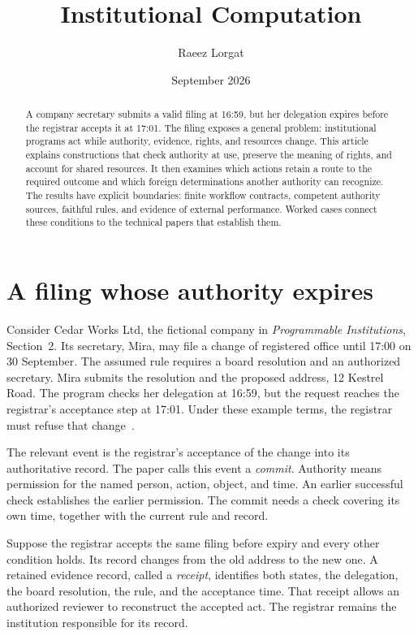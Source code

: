 \documentclass{momentum}
\title{Institutional Computation}
\author{Raeez Lorgat}
\date{September 2026}
\begin{document}
\maketitle

\begin{abstract}
A company secretary submits a valid filing at 16:59, but her delegation expires before the registrar accepts it at 17:01.
The filing exposes a general problem: institutional programs act while authority, evidence, rights, and resources change.
This article explains constructions that check authority at use, preserve the meaning of rights, and account for shared resources.
It then examines which actions retain a route to the required outcome and which foreign determinations another authority can recognize.
The results have explicit boundaries: finite workflow contracts, competent authority sources, faithful rules, and evidence of external performance.
Worked cases connect these conditions to the technical papers that establish them.
\end{abstract}

\section{A filing whose authority expires}
\label{sec:filing}

Consider Cedar Works Ltd, the fictional company in \emph{Programmable Institutions}, Section~2.
Its secretary, Mira, may file a change of registered office until 17:00 on 30 September.
The assumed rule requires a board resolution and an authorized secretary.
Mira submits the resolution and the proposed address, 12 Kestrel Road.
The program checks her delegation at 16:59, but the request reaches the registrar's acceptance step at 17:01.
Under these example terms, the registrar must refuse that change~\cite[Section~2]{institutions}.

The relevant event is the registrar's acceptance of the change into its authoritative record.
The paper calls this event a \emph{commit}.
Authority means permission for the named person, action, object, and time.
An earlier successful check establishes the earlier permission.
The commit needs a check covering its own time, together with the current rule and record.

Suppose the registrar accepts the same filing before expiry and every other condition holds.
Its record changes from the old address to the new one.
A retained evidence record, called a \emph{receipt}, identifies both states, the delegation, the board resolution, the rule, and the acceptance time.
That receipt allows an authorized reviewer to reconstruct the accepted act.
The registrar remains the institution responsible for its record.
\end{document}
